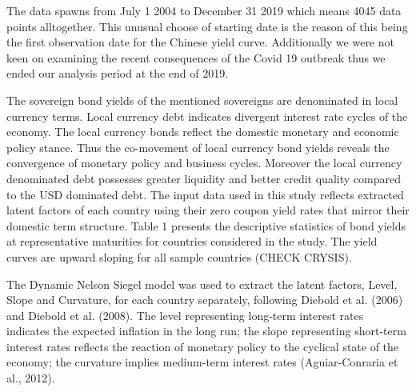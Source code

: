 \documentclass{article}
\begin{document}
The data spawns from July 1 2004 to December 31 2019 which means 4045 data points alltogether. This unusual choose of starting date is the reason of this being the first observation date for the Chinese yield curve. Additionally we were not keen on examining the recent consequences of the Covid 19 outbreak thus we ended our analysis period at the end of 2019. 

The sovereign bond yields of the mentioned sovereigns are denominated in local currency terms. Local currency debt indicates divergent interest rate cycles of the economy. The local currency bonds reflect the domestic monetary and economic policy stance. Thus the co-movement of local currency bond yields reveals the convergence of monetary policy and business cycles. Moreover the local currency denominated debt possesses greater liquidity and better credit quality compared to the USD dominated debt. The input data used in this study reflects extracted latent factors of each country using their zero coupon yield rates that mirror their domestic term structure. Table 1 presents the descriptive statistics of bond yields at representative maturities for countries considered in the study. The yield curves are upward sloping for all sample countries (CHECK CRYSIS).

The Dynamic Nelson Siegel model was used to extract the latent factors, Level, Slope and Curvature, for each country separately, following Diebold et al. (2006) and Diebold et al. (2008). The level representing long-term interest rates indicates the expected inflation in the long run; the slope representing short-term interest rates reflects the reaction of monetary policy to the cyclical state of the economy; the curvature implies medium-term interest rates (Aguiar-Conraria et al., 2012). 

\end{document}

